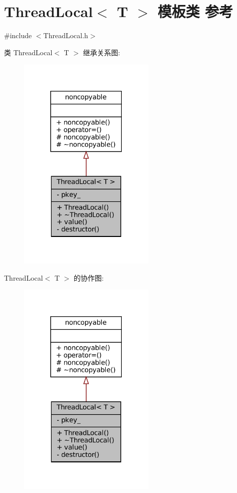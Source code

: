 \hypertarget{classmuduo_1_1ThreadLocal}{}\section{Thread\+Local$<$ T $>$ 模板类 参考}
\label{classmuduo_1_1ThreadLocal}


{\ttfamily \#include $<$Thread\+Local.\+h$>$}



类 Thread\+Local$<$ T $>$ 继承关系图\+:
\nopagebreak
\begin{figure}[H]
\begin{center}
\leavevmode
\includegraphics[width=186pt]{classmuduo_1_1ThreadLocal__inherit__graph}
\end{center}
\end{figure}


Thread\+Local$<$ T $>$ 的协作图\+:
\nopagebreak
\begin{figure}[H]
\begin{center}
\leavevmode
\includegraphics[width=186pt]{classmuduo_1_1ThreadLocal__coll__graph}
\end{center}
\end{figure}
